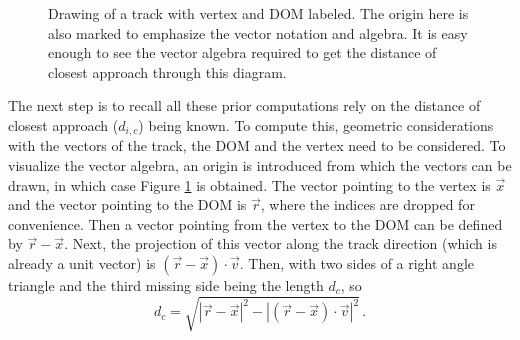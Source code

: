 \begin{figure}
  \centering
  \caption{Drawing of a track with vertex and DOM labeled. The origin here is also marked to emphasize the vector notation and algebra. It is easy enough to see the vector algebra required to get the distance of closest approach through this diagram.}
  \label{fig:dic}
\end{figure}

The next step is to recall all these prior computations rely on the distance of closest approach ($d_{i,c}$) being known. To compute this, geometric considerations with the vectors of the track, the DOM and the vertex need to be considered. To visualize the vector algebra, an origin is introduced from which the vectors can be drawn, in which case Figure \ref{fig:dic} is obtained. The vector pointing to the vertex is $\vec{x}$ and the vector pointing to the DOM is $\vec{r}$, where the indices are dropped for convenience. Then a vector pointing from the vertex to the DOM can be defined by $\vec{r} - \vec{x}$. Next, the projection of this vector along the track direction (which is already a unit vector) is $(\vec{r} - \vec{x})\cdot\vec{v}$. Then, with two sides of a right angle triangle and the third missing side being the length $d_{c}$, so
\begin{equation}
  d_{c} = \sqrt{|\vec{r} - \vec{x}|^{2} - |(\vec{r} - \vec{x})\cdot\vec{v}|^{2}}\, .
\end{equation}

